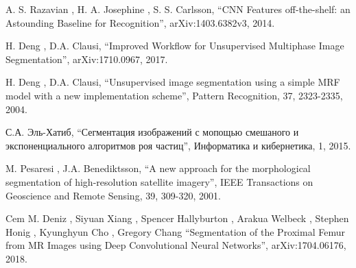 \documentclass[14pt, a4paper, oneside, bold]{extarticle}
\begin{document}
\begin{thebibliography}{99}
 A. S. Razavian
	, H. A. Josephine
	, S. S. Carlsson,
	``CNN Features off-the-shelf: an Astounding Baseline for Recognition'', 
arXiv:1403.6382v3, 2014.

 H. Deng
	, D.A. Clausi, 
	``Improved Workflow for Unsupervised Multiphase Image Segmentation'', 
arXiv:1710.0967, 2017.

 H. Deng
	, D.A. Clausi, 
	``Unsupervised image segmentation using a simple MRF model with a new implementation scheme'', 
Pattern Recognition, 37, 2323-2335, 2004.

 С.А. Эль-Хатиб,
	``Сегментация изображений с мопощью смешаного и экспоненциального алгоритмов роя частиц'', 
Информатика и кибернетика, 1, 2015.

  M. Pesaresi
	, J.A. Benediktsson,
	``A new approach for the morphological segmentation of high-resolution satellite imagery'', 
 IEEE Transactions on Geoscience and Remote Sensing, 39, 309-320, 2001.

  Cem M. Deniz
	, Siyuan Xiang
	, Spencer Hallyburton
	, Arakua Welbeck
	, Stephen Honig
	, Kyunghyun Cho
	, Gregory Chang
	``Segmentation of the Proximal Femur from MR Images using Deep Convolutional Neural Networks'', 
 	arXiv:1704.06176, 2018.




\end{thebibliography}
\end{document}
